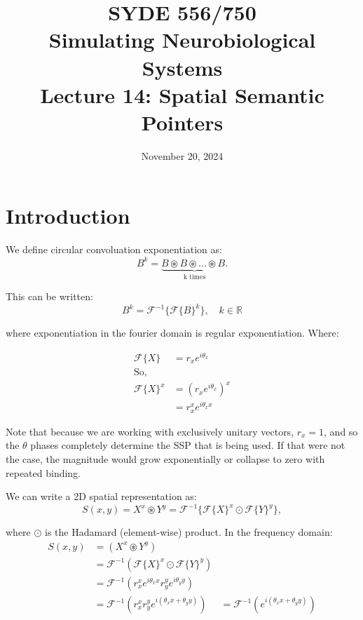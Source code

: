 \documentclass[10pt,letterpaper,oneside]{article}
\date{November 20, 2024}
\title{SYDE 556/750 \\ Simulating Neurobiological Systems \\ Lecture 14: Spatial Semantic Pointers}
\begin{document}

\section{Introduction}


We define circular convoluation exponentiation as: 
\begin{equation}
  B^k = \underbrace{B \circledast B \circledast \dots \circledast B. }_{\text{k times}}
\end{equation}

This can be written: 
\begin{equation}
  B^k = \mathcal{F}^{-1}\{\mathcal{F}\{B\}^k\}, \quad k \in \mathbb{R}
\end{equation}

where exponentiation in the fourier domain is regular exponentiation.  Where: 

\begin{align}
  \mathcal{F}\{ X\} &= r_{x} e^{i \theta_{x}} \\
  \textrm{So,}\\
  \mathcal{F}\{ X\}^x &= \left( r_{x} e^{i \theta_{x}} \right)^x \\
  &= r_{x}^x e^{i \theta_{x} x} 
\end{align}

Note that because we are working with exclusively unitary vectors, $r_x = 1$, and so the $\theta$ phases completely determine the SSP that is being used. If that were not the case, the magnitude would grow exponentially or collapse to zero with repeated binding.

We can write a 2D spatial representation as: 
\begin{equation}
  S(x,y) = X^x \circledast Y^y = \mathcal{F}^{-1}\{\mathcal{F}\{X\}^x\odot\mathcal{F} \{Y\}^y\},
\end{equation}

where $\odot$ is the Hadamard (element-wise) product. In the frequency domain: 
\begin{align}
  S(x, y) &= (X^{x} \circledast Y^{y}) \\
   &= \mathcal{F}^{-1}( \mathcal{F}\{ X\}^{x} \odot \mathcal{F}\{ Y\}^{y} ) \\
   &=  \mathcal{F}^{-1}(r_{x}^x e^{ i \theta_{x} x} r_{y}^y  e^{i \theta_{y} y })\\
   &=  \mathcal{F}^{-1}(r_{x}^x r_{y}^y e^{ i(\theta_{x} x + \theta_{y} y )})
   &=  \mathcal{F}^{-1}(e^{ i(\theta_{x} x + \theta_{y} y )})
\end{align}
\end{document}
